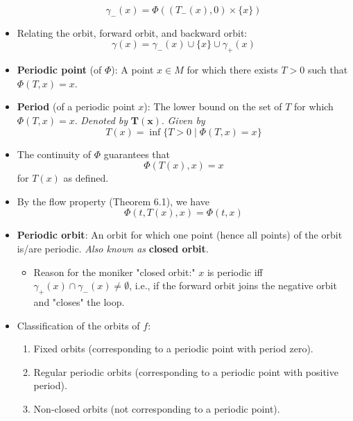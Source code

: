 \documentclass[../notes.tex]{subfiles}
\begin{document}
\begin{itemize}
    \begin{equation*}
        \gamma_-(x) = \Phi((T_-(x),0)\times\{x\})
    \end{equation*}
    \item Relating the orbit, forward orbit, and backward orbit:
    \begin{equation*}
        \gamma(x) = \gamma_-(x)\cup\{x\}\cup\gamma_+(x)
    \end{equation*}
    \item \textbf{Periodic point} (of $\Phi$): A point $x\in M$ for which there exists $T>0$ such that $\Phi(T,x)=x$.
    \item \textbf{Period} (of a periodic point $x$): The lower bound on the set of $T$ for which $\Phi(T,x)=x$. \emph{Denoted by} $\bm{T(x)}$. \emph{Given by}
    \begin{equation*}
        T(x) = \inf\{T>0\mid\Phi(T,x)=x\}
    \end{equation*}
    \item The continuity of $\Phi$ guarantees that
    \begin{equation*}
        \Phi(T(x),x) = x
    \end{equation*}
    for $T(x)$ as defined.
    \item By the flow property (Theorem 6.1), we have
    \begin{equation*}
        \Phi(t,T(x),x) = \Phi(t,x)
    \end{equation*}
    \item \textbf{Periodic orbit}: An orbit for which one point (hence all points) of the orbit is/are periodic. \emph{Also known as} \textbf{closed orbit}.
    \begin{itemize}
        \item Reason for the moniker "closed orbit:" $x$ is periodic iff $\gamma_+(x)\cap\gamma_-(x)\neq\emptyset$, i.e., if the forward orbit joins the negative orbit and "closes" the loop.
    \end{itemize}
    \item Classification of the orbits of $f$:
    \begin{enumerate}
        \item Fixed orbits (corresponding to a periodic point with period zero).
        \item Regular periodic orbits (corresponding to a periodic point with positive period).
        \item Non-closed orbits (not corresponding to a periodic point).
    \end{enumerate}

\end{itemize}
\end{document}
